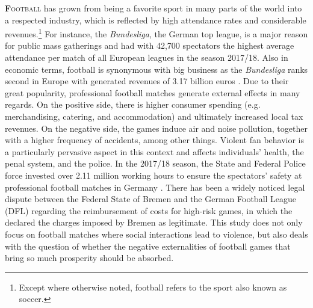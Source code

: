 
\lettrine[lines=2,nindent=0pt]{\color{darkgray}\textbf{F}}{ootball} has grown from being a favorite sport in many parts of the world into a respected industry, which is reflected by high attendance rates and considerable revenues.\footnote{Except where otherwise noted, football refers to the sport also known as soccer.} For instance, the \textit{Bundesliga}, the German top league, is a major reason for public mass gatherings and had with 42,700 spectators the highest average attendance per match of all European leagues in the season 2017/18. Also in economic terms, football is synonymous with big business as the \textit{Bundesliga} ranks second in Europe with generated revenues of 3.17 billion euros \citep{deloitte2019report}. Due to their great popularity, professional football matches generate external effects in many regards. On the positive side, there is higher consumer spending (e.g. merchandising, catering, and accommodation) and ultimately increased local tax revenues. On the negative side, the games induce air and noise pollution, together with a higher frequency of accidents, among other things. Violent fan behavior is a particularly pervasive aspect in this context and affects individuals' health, the penal system, and the police. In the 2017/18 season, the State and Federal Police force invested over 2.11 million working hours to ensure the spectators' safety at professional football matches in Germany \citep{zis17_18}. There has been a widely noticed legal dispute between the Federal State of Bremen and the German Football League (DFL) regarding the reimbursement of costs for high-risk games, in which the \cite{fac_2019} declared the charges imposed by Bremen as legitimate. This study does not only focus on football matches where social interactions lead to violence, but also deals with the question of whether the negative externalities of football games that bring so much prosperity should be absorbed. 




